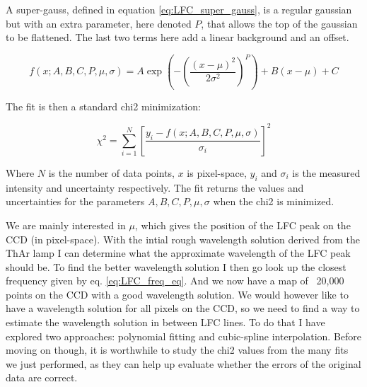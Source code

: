     A super-gauss, defined in equation \ref{eq:LFC_super_gauss}, is a regular gaussian but with an extra parameter, here denoted $P$, that allows the top of the gaussian to be flattened. The last two terms here add a linear background and an offset.  
    
    \begin{equation}
        \label{eq:LFC_super_gauss}
        f(x ; A, B, C, P, \mu, \sigma) = A \exp \left(-\left(\frac{\left(x-\mu\right)^{2}}{2 \sigma^{2}}\right)^{P}\right) + B(x-\mu) + C
    \end{equation}

    The fit is then a standard chi2 minimization:

    \begin{equation}
        \label{eq:chi2_super_gauss}
        \chi^{2}=\sum_{i=1}^{N}\left[\frac{y_{i}-f(x ; A, B, C, P, \mu, \sigma)}{\sigma_{i}}\right]^{2}
    \end{equation}

    Where $N$ is the number of data points, $x$ is pixel-space, $y_i$ and $\sigma_i$ is the measured intensity and uncertainty respectively. The fit returns the values and uncertainties for the parameters $A, B, C, P, \mu, \sigma$ when the chi2 is minimized.
    
    We are mainly interested in $\mu$, which gives the position of the LFC peak on the CCD (in pixel-space). With the intial rough wavelength solution derived from the ThAr lamp I can determine what the approximate wavelength of the LFC peak should be. To find the better wavelength solution I then go look up the closest frequency given by eq. \ref{eq:LFC_freq_eq}. And we now have a map of ~20,000 points on the CCD with a good wavelength solution. We would however like to have a wavelength solution for all pixels on the CCD, so we need to find a way to estimate the wavelength solution in between LFC lines. To do that I have explored two approaches: polynomial fitting and cubic-spline interpolation. Before moving on though, it is worthwhile to study the chi2 values from the many fits we just performed, as they can help up evaluate whether the errors of the original data are correct.
    
